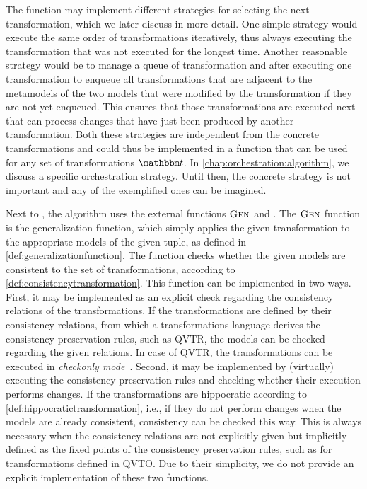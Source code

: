 The  function may implement different strategies for selecting the next transformation, which we later discuss in more detail.
One simple strategy would execute the same order of transformations iteratively, thus always executing the transformation that was not executed for the longest time.
Another reasonable strategy would be to manage a queue of transformation and after executing one transformation to enqueue all transformations that are adjacent to the metamodels of the two models that were modified by the transformation if they are not yet enqueued.
This ensures that those transformations are executed next that can process changes that have just been produced by another transformation.
Both these strategies are independent from the concrete transformations and could thus be implemented in a function that can be used for any set of transformations $\transformationset{T}$.
In \autoref{chap:orchestration:algorithm}, we discuss a specific orchestration strategy.
Until then, the concrete strategy is not important and any of the exemplified ones can be imagined.

Next to , the algorithm uses the external functions $\textsc{Gen}_{}$ and .
The $\textsc{Gen}_{}$ function is the generalization function, which simply applies the given transformation to the appropriate models of the given tuple, as defined in \autoref{def:generalizationfunction}.
The  function checks whether the given models are consistent to the set of transformations, according to \autoref{def:consistencytransformation}.
This function can be implemented in two ways.
First, it may be implemented as an explicit check regarding the consistency relations of the transformations.
If the transformations are defined by their consistency relations, from which a transformations language derives the consistency preservation rules, such as \gls{QVTR}, the models can be checked regarding the given relations.
In case of \gls{QVTR}, the transformations can be executed in \emph{checkonly mode}~\cite[7.9]{qvt}.
Second, it may be implemented by (virtually) executing the consistency preservation rules and checking whether their execution performs changes.
If the transformations are hippocratic according to \autoref{def:hippocratictransformation}, i.e., if they do not perform changes when the models are already consistent, consistency can be checked this way.
This is always necessary when the consistency relations are not explicitly given but implicitly defined as the fixed points of the consistency preservation rules, such as for transformations defined in \gls{QVTO}.
Due to their simplicity, we do not provide an explicit implementation of these two functions.

